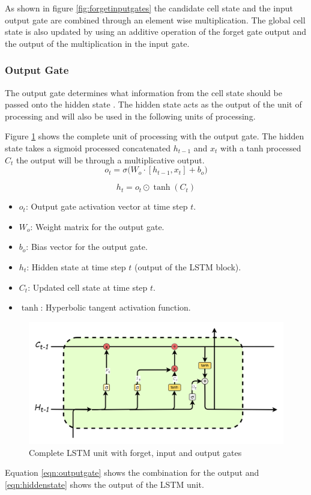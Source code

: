 As shown in figure \ref{fig:forgetinputgates} the candidate cell state and the input output gate are combined through an element wise multiplication. The global cell state is also updated by using an additive operation of the forget gate output and the output of the multiplication in the input gate.
 \subsubsection{Output Gate}
The output gate determines what information from the cell state should be passed onto the hidden state \cite{zhu2025novel}. The hidden state acts as the output of the unit of processing and will also be used in the following units of processing.
 
 Figure \ref{fig:forgetinputoutputgates1} shows the complete unit of processing with the output gate. The hidden state takes a sigmoid processed concatenated $h_{t-1}$ and $x_t$ with a tanh processed $C_t$ the output will be through a multiplicative output. 
 \[
 o_t = \sigma \Big( W_o \cdot [h_{t-1}, x_t] + b_o \Big)
 \tag{21}
 \label{eqn:outputgate}
 \]
 
 \[
 h_t = o_t \odot \tanh(C_t)
 \tag{22}
 \label{eqn:hiddenstate}
 \]
 \begin{itemize}
 	\item $o_t$: Output gate activation vector at time step $t$.
 	\item $W_o$: Weight matrix for the output gate.
 	\item $b_o$: Bias vector for the output gate.
 	\item $h_t$: Hidden state at time step $t$ (output of the LSTM block).
 	\item $C_t$: Updated cell state at time step $t$.
 	\item $\tanh$: Hyperbolic tangent activation function.
 \end{itemize}
 \begin{figure}[h]
 	\centering
 	\includegraphics[width=0.5\linewidth]{Chapters/images/forget_input_output_gates1}
 	\caption{Complete LSTM unit with forget, input and output gates }
 	\label{fig:forgetinputoutputgates1}
 \end{figure}
  Equation \ref{eqn:outputgate}  shows the combination for the output and \ref{eqn:hiddenstate} shows the output of the LSTM unit.
  
